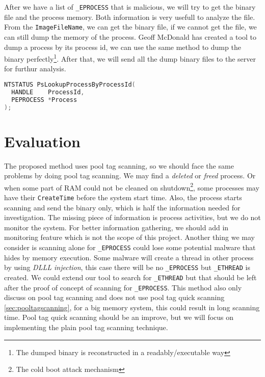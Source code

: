 After we have a list of \texttt{\_EPROCESS} that is malicious, we will try to get the binary file and the process memory. Both information is very usefull to analyze the file. From the \texttt{ImageFileName}, we can get the binary file, if we cannot get the file, we can still dump the memory of the process. Geoff McDonald \cite{processdump} has created a tool to dump a process by its process id, we can use the same method to dump the binary perfectly\footnote{The dumped binary is reconstructed in a readably/executable way}. After that, we will send all the dump binary files to the server for furthur analysis.

\begin{lstlisting}[language=c,caption={PsLookupProcessByProcessId},label={lst:pslook}]
NTSTATUS PsLookupProcessByProcessId(
  HANDLE    ProcessId,
  PEPROCESS *Process
);
\end{lstlisting}

\section[Evaluation]{Evaluation}

The proposed method uses pool tag scanning, so we should face the same problems by doing pool tag scanning. We may find a \textit{deleted} or \textit{freed} process. Or when some part of RAM could not be cleaned on shutdown\footnote{The cold boot attack mechanism}, some processes may have their \texttt{CreateTime} before the system start time. Also, the process starts scanning and send the binary only, which is half the information needed for investigation. The missing piece of information is process activities, but we do not monitor the system. For better information gathering, we should add in monitoring feature which is not the scope of this project. Another thing we may consider is scanning alone for \texttt{\_EPROCESS} could lose some potential malware that hides by memory execution. Some malware will create a thread in other process by using \textit{DLLL injection}, this case there will be no \texttt{\_EPROCESS} but \texttt{\_ETHREAD} is created. We could extend our tool to search for \texttt{\_ETHREAD} but that should be left after the proof of concept of scanning for \texttt{\_EPROCESS}. This method also only discuss on pool tag scanning and does not use pool tag quick scanning \ref{sec:pooltagscanning}, for a big memory system, this could result in long scanning time. Pool tag quick scanning should be an improve, but we will focus on implementing the plain pool tag scanning technique.

